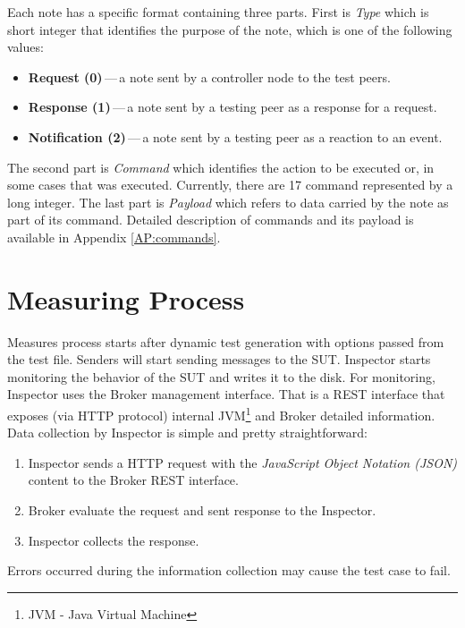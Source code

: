 
Each note has a specific format containing three parts. First is \emph{Type} which is short integer that identifies the purpose of the note, which is one of the following values:

\begin{itemize}
	\setlength\itemsep{0em}
	\item \textbf{Request (0)}\,---\,a note sent by a controller node to the test peers.
	\item \textbf{Response (1)}\,---\,a note sent by a testing peer as a response for a request.
	\item \textbf{Notification (2)}\,---\,a note sent by a testing peer as a reaction to an event.
\end{itemize}
The second part is \emph{Command} which identifies the action to be executed or, in some cases that was executed. Currently, there are 17 command represented by a long integer. The last part is \emph{Payload} which refers to data carried by the note as part of its command. Detailed description of commands and its payload is available in Appendix \ref{AP:commands}.


\section{Measuring Process}
\label{Measuring Process}
Measures process starts after dynamic test generation with options passed from the test file. Senders will start sending messages to the SUT. Inspector starts monitoring the behavior of the SUT and writes it to the disk. For monitoring, Inspector uses the Broker management interface. That is a REST interface that exposes (via HTTP protocol) internal JVM\footnote{JVM - Java Virtual Machine} and Broker detailed information. Data collection by Inspector is simple and pretty straightforward:

\begin{enumerate}
	\setlength\itemsep{0em}
	\item Inspector sends a HTTP request with the \emph{JavaScript Object Notation\footnotemark{} (JSON)} content to the Broker REST interface.
	\item Broker evaluate the request and sent response to the Inspector.
	\item Inspector collects the response.
\end{enumerate}
Errors occurred during the information collection may cause the test case to fail.

